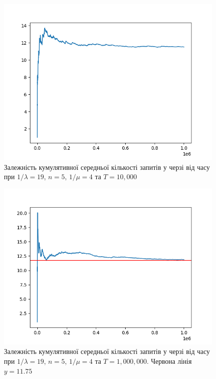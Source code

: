 \documentclass[14pt]{extarticle}
\begin{document}
\begin{figure}
  \centering
  \includegraphics{10_000_seconds-queue_length_mean.png}\caption{{Залежність
      кумулятивної середньої кількості запитів у черзі від часу при
      \(1/\lambda = 19\), \(n = 5\), \(1/\mu = 4\) та
      \(T = 10,000\)}}\label{img:exp-queue-length-mean-10-000}
\end{figure}

\begin{figure}
  \centering
  \includegraphics{1_000_000_seconds-queue_length_mean.png}\caption{{Залежність
      кумулятивної середньої кількості запитів у черзі від часу при
      \(1/\lambda = 19\), \(n = 5\), \(1/\mu = 4\) та \(T = 1,000,000\). Червона лінія
      \(y = 11.75\)}}\label{img:exp-queue-length-mean-1-000-000}
\end{figure}
\end{document}
